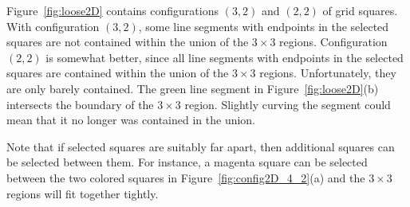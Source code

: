 Figure~\ref{fig:loose2D} contains configurations $(3,2)$ and $(2,2)$
of grid squares.
With configuration $(3,2)$, some line segments with endpoints
in the selected squares are not contained within the union
of the $3 \times 3$ regions.
Configuration $(2,2)$ is somewhat better,
since all line segments with endpoints in the selected squares
are contained within the union of the $3 \times 3$ regions.
Unfortunately, they are only barely contained.
The green line segment in Figure~\ref{fig:loose2D}(b) intersects
the boundary of the $3 \times 3$ region.
Slightly curving the segment could mean that it no longer was contained
in the union.

Note that if selected squares are suitably far apart,
then additional squares can be selected between them.
For instance, a magenta square can be selected between the two colored squares
in Figure~\ref{fig:config2D_4_2}(a) and the $3 \times 3$ regions
will fit together tightly.

